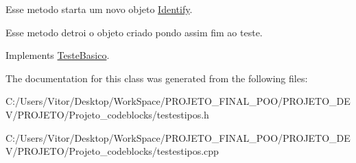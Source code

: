 Esse metodo starta um novo objeto \hyperlink{class_identify}{Identify}. 

Esse metodo detroi o objeto criado pondo assim fim ao teste. 

Implements \hyperlink{class_teste_basico_a9801730ac8a0acc39a901a179aa91e97}{Teste\-Basico}.



The documentation for this class was generated from the following files\-:\begin{DoxyCompactItemize}
\item 
C\-:/\-Users/\-Vitor/\-Desktop/\-Work\-Space/\-P\-R\-O\-J\-E\-T\-O\-\_\-\-F\-I\-N\-A\-L\-\_\-\-P\-O\-O/\-P\-R\-O\-J\-E\-T\-O\-\_\-\-D\-E\-V/\-P\-R\-O\-J\-E\-T\-O/\-Projeto\-\_\-codeblocks/testestipos.\-h\item 
C\-:/\-Users/\-Vitor/\-Desktop/\-Work\-Space/\-P\-R\-O\-J\-E\-T\-O\-\_\-\-F\-I\-N\-A\-L\-\_\-\-P\-O\-O/\-P\-R\-O\-J\-E\-T\-O\-\_\-\-D\-E\-V/\-P\-R\-O\-J\-E\-T\-O/\-Projeto\-\_\-codeblocks/testestipos.\-cpp\end{DoxyCompactItemize}
